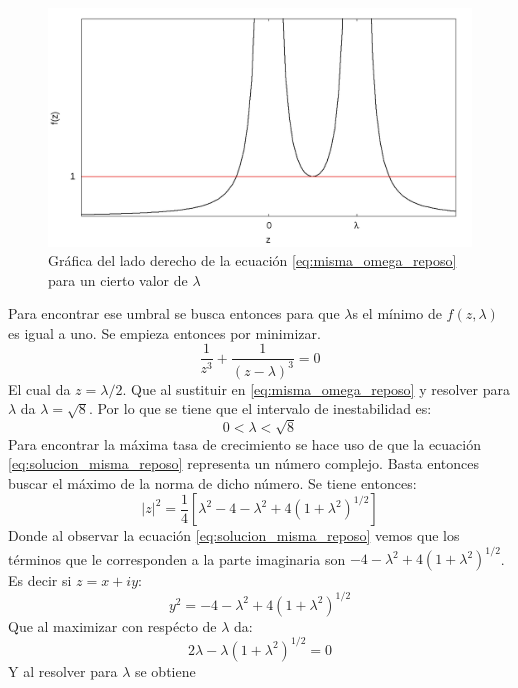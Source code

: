 \documentclass[../tesis_main_file.tex]{subfiles}
\begin{document}
\begin{figure}
\includegraphics[height=0.3\paperheight]{f_z_reposo.png}
\caption{Gráfica del lado derecho de la ecuación \ref{eq:misma_omega_reposo} para un cierto valor de $\lambda$}
\label{fig:fz_reposo}
\end{figure}
Para encontrar ese umbral se busca entonces para que $\lambda$s el mínimo de $f(z,\lambda)$ es igual a uno. Se empieza entonces por minimizar.
\begin{equation}
\frac{1}{z^3} + \frac{1}{(z-\lambda)^3}=0
\end{equation}
El cual da $z=\lambda / 2$. Que al sustituir en \ref{eq:misma_omega_reposo} y resolver para $\lambda$ da $\lambda = \sqrt{8}$. Por lo que se tiene que el intervalo de inestabilidad es:
\begin{equation}
0 < \lambda < \sqrt{8}
\end{equation}
Para encontrar la máxima tasa de crecimiento se hace uso de que la ecuación \ref{eq:solucion_misma_reposo} representa un número complejo. Basta entonces buscar el máximo de la norma de dicho número. Se tiene entonces:
\begin{equation}
|z|^2 = \frac{1}{4}[\lambda^2 -4 - \lambda^2 + 4(1 + \lambda^2)^{1/2}]
\end{equation}
Donde al observar la ecuación \ref{eq:solucion_misma_reposo} vemos que los términos que le corresponden a la parte imaginaria son $-4 - \lambda^2 + 4(1 + \lambda^2)^{1/2}$. Es decir si $z=x +iy$:
\begin{equation}
y^2= -4 - \lambda^2 + 4(1 + \lambda^2)^{1/2}
\end{equation}
Que al maximizar con respécto de $\lambda$ da:
\begin{equation}
2\lambda -\lambda(1 + \lambda^2)^{1/2} =0
\end{equation}
Y al resolver para $\lambda$ se obtiene
\end{document}

